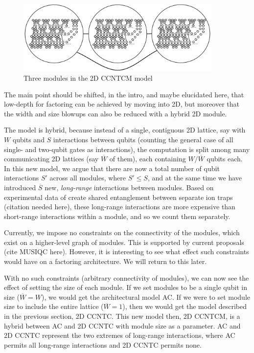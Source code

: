 \begin{figure}[btp!]
\begin{center}
\includegraphics[width=4in]{factor-polylog/figures/modules.pdf}
\end{center}
\caption{Three modules in the \textsf{2D CCNTCM} model}
\label{fig:modules}
\end{figure}



The main point should be shifted, in the intro, and maybe elucidated here,
that low-depth for factoring can be achieved by moving into 2D, but
moreover that the width and size blowups can also be reduced with a
hybrid 2D module.

The model is hybrid, because instead of a single, contiguous 2D lattice,
say with $W$ qubits and $S$ interactions between qubits (counting the
general case of all single- and two-qubit gates as interactions),
the computation is split among many communicating 2D lattices
(say $\overline{W}$ of them), each containing $W/\overline{W}$ qubits
each. In this new model, we argue that there are now a total number of
qubit interactions $S'$ across all modules, where $S' \le S$, and at
the same time we have introduced $\overline{S}$
new, \emph{long-range} interactions between modules. Based on experimental
data of create shared entanglement between separate ion traps (citation needed here),
these long-range interactions are more expensive than short-range interactions
within a module, and so we count them separately.

Currently, we impose no constraints on the connectivity of the modules, which exist
on a higher-level graph of modules. This is supported by current proposals
(cite MUSIQC here). However, it is interesting to see what effect such constraints
would have on a factoring architecture. We will return to this later.


With no such constraints (arbitrary connectivity of modules), we can now see the
effect of setting the size of each module. If we set modules
to be a single qubit in size ($\overline{W} = W$), we would get the architectural
model \textsf{AC}. If we were to set module size to include the entire lattice
($\overline{W} = 1$), then we would get the model described in the previous
section, \textsf{2D CCNTC}. This new model then, \textsf{2D CCNTCM}, is a hybrid
between \textsf{AC} and \textsf{2D CCNTC} with module size as a parameter.
\textsf{AC} and \textsf{2D CCNTC} represent the two extremes of long-range
interactions, where \textsf{AC} permits all long-range interactions and
\textsf{2D CCNTC} permits none.

